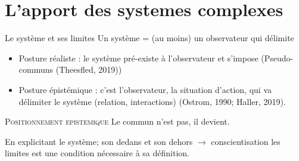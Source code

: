 \documentclass[newPxFont]{beamer}
\begin{document}

\section{L'apport des systemes complexes}

\begin{frame}[c]{Le système et ses limites}
\vspace{-1cm}
Un système = (au moins) un observateur qui délimite
\begin{itemize}
  \item Posture réaliste : le système pré-existe à l'observateur et s'impose (Pseudo-communs (Theesfled, 2019))
  \item Posture épistémique : c'est l'observateur, la situation d'action, qui va délimiter le système (relation, interactions) (Ostrom, 1990; Haller, 2019).
\end{itemize}

\small{
  \begin{alertblock}{\textsc{Positionnement epistemique}}
      Le commun n'est pas, il devient.
  \end{alertblock}
}

En explicitant le système; son dedans et son dehors $\rightarrow$  conscientisation les limites est une condition nécessaire à sa définition.


\end{frame}
\end{document}

